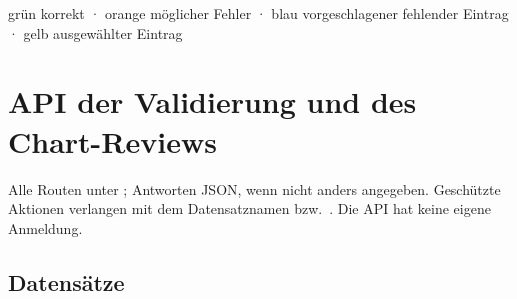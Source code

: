 \documentclass[11pt,a4paper,parskip=half-,headings=standardclasses,toc=bibliography,open=any]{scrreprt}
\begin{document}
\begin{tcolorbox}[enhanced,colback=white,colframe=otblau,arc=2pt,boxrule=0.8pt,title=\sffamily\bfseries Farben im Brief,colbacktitle=otblau]
\textcolor{otgruen}{grün} korrekt · \textcolor{otorange}{orange} möglicher Fehler · \textcolor{otblau}{blau} vorgeschlagener fehlender Eintrag · gelb ausgewählter Eintrag
\end{tcolorbox}

\chapter{API der Validierung und des Chart-Reviews}\label{anh:api}

Alle Routen unter ; Antworten JSON, wenn nicht anders angegeben. Geschützte Aktionen verlangen  mit dem Datensatznamen bzw.\ . Die API hat keine eigene Anmeldung.

\section{Datensätze}
\end{document}

